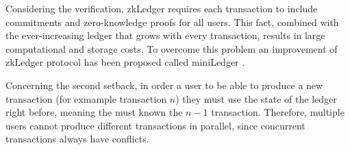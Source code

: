 Considering the verification, zkLedger requires each transaction to include commitments and zero-knowledge proofs for all users. This fact, combined with the ever-increasing ledger that grows with every transaction, results in large computational and storage costs. To overcome this problem an improvement of zkLedger protocol has been proposed called miniLedger \cite{MiniLedger}.

Concerning the second setback, in order a user to be able to produce a new transaction (for exmample transaction $n$) they must use the state of the ledger right before, meaning the must known the $n-1$ transaction. Therefore, multiple users cannot produce different transactions in parallel, since concurrent transactions always have conflicts.